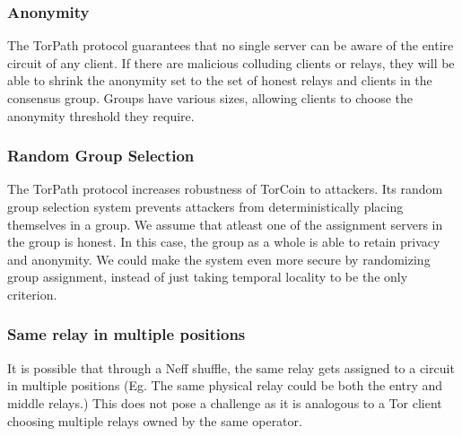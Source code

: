 {\subsubsection{Anonymity} The TorPath protocol guarantees that no single
server can be aware of the entire circuit of any client. If there are malicious
colluding clients or relays, they will be able to shrink the anonymity set to
the set of honest relays and clients in the consensus group.  Groups have
various sizes, allowing clients to choose the anonymity threshold they
require.

\subsubsection{Random Group Selection} The TorPath protocol increases
robustness of TorCoin to attackers. Its random group selection system prevents
attackers from deterministically placing themselves in a group. We assume that
atleast one of the assignment servers in the group is honest. In this case,
the group as a whole is able to retain privacy and anonymity. We could make
the system even more secure by randomizing group assignment, instead of just
taking temporal locality to be the only criterion.

\subsubsection{Same relay in multiple positions}  It is possible that through
a Neff shuffle, the same relay gets assigned to a circuit in multiple
positions (Eg. The same physical relay could be both the entry and middle
relays.) This does not pose a challenge as it is analogous to a Tor client
choosing multiple relays owned by the same operator.





}
